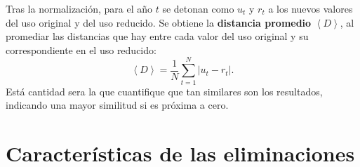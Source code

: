 Tras la normalización, para el año $t$ se detonan como $u_{t}$ y $r_{t}$ a los nuevos valores del uso original y del uso reducido. Se obtiene la \textbf{distancia promedio} $\left\langle D \right\rangle $, al promediar las distancias que hay entre cada valor del uso original y su correspondiente en el uso reducido: 
\begin{equation}
\left\langle D \right\rangle  = \frac{1}{N}\sum_{t=1}^{N} \left| u_{t} - r_{t} \right|  .
\label{ec.Distancia_prom}
\end{equation}
Está cantidad sera la que cuantifique que tan similares son los resultados, indicando una mayor similitud si es próxima a cero. 




\section{Características de las eliminaciones}

